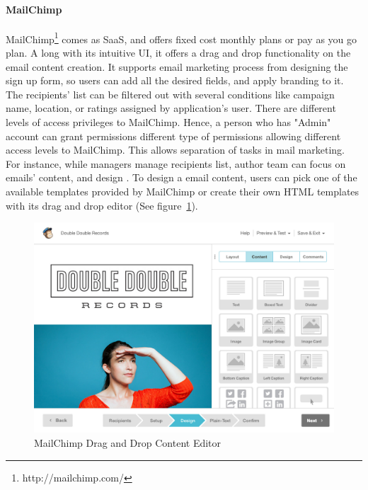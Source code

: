 \paragraph{MailChimp}
MailChimp\footnote{http://mailchimp.com/} comes as \ac{SaaS}, and offers fixed cost monthly plans or pay as you go plan. A long with its intuitive \ac{UI}, it offers a drag and drop functionality on the email content creation. It supports email marketing process from designing the sign up form, so users can add all the desired fields, and apply branding to it. The recipients' list can be filtered out with several conditions like campaign name, location, or ratings assigned by application's user. There are different levels of access privileges to MailChimp. Hence, a person who has "Admin" account can grant permissions different type of permissions allowing different access levels to MailChimp. This allows separation of tasks in mail marketing. For instance, while managers manage recipients list, author team can focus on emails' content, and design \citep{TheRocketScienceGroupLLC2013}. To design a email content, users can pick one of the available templates provided by MailChimp or create their own \ac{HTML} templates with its drag and drop editor (See figure~\ref{fig:MailChimp-DragAndDropEditor}).
\vspace{1cm}

\begin{figure}[htbp]
	\centering
	\includegraphics[width=1.00\textwidth]{imgs/MailChimp-DragAndDropEditor.jpg}
	\caption[MailChimp Drag and Drop Content Editor]{MailChimp Drag and Drop Content Editor \citep{TheRocketScienceGroupLLC2013a}}
	\label{fig:MailChimp-DragAndDropEditor}
\end{figure}

